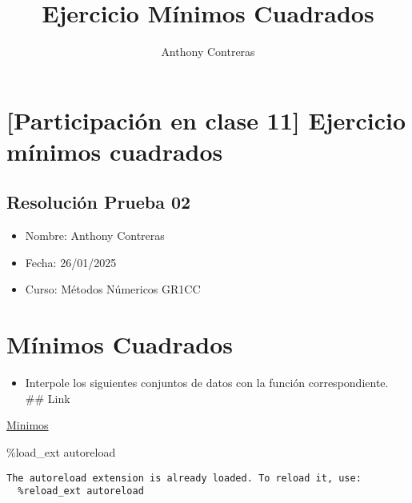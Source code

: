\documentclass[
  letterpaper,
  DIV=11,
  numbers=noendperiod]{scrartcl}
\title{Ejercicio Mínimos Cuadrados}
\author{Anthony Contreras}
\date{}
\newenvironment{Shaded}{\begin{snugshade}}{\end{snugshade}}
\newcommand{\NormalTok}[1]{\textcolor[rgb]{0.00,0.23,0.31}{#1}}
\newcommand{\OperatorTok}[1]{\textcolor[rgb]{0.37,0.37,0.37}{#1}}
\providecommand{\tightlist}{%
  \setlength{\itemsep}{0pt}\setlength{\parskip}{0pt}}\usepackage{longtable,booktabs,array}
\renewcommand*\contentsname{Tabla de contenidos}
\newcommand\contentsname{Tabla de contenidos}
\begin{document}
\maketitle

\renewcommand*\contentsname{Tabla de Contenidos}
{
\hypersetup{linkcolor=}
\setcounter{tocdepth}{3}
\tableofcontents
}

\section{{[}Participación en clase 11{]} Ejercicio mínimos
cuadrados}\label{participaciuxf3n-en-clase-11-ejercicio-muxednimos-cuadrados}

\subsection{Resolución Prueba 02}\label{resoluciuxf3n-prueba-02}

\begin{itemize}
\tightlist
\item
  Nombre: Anthony Contreras
\item
  Fecha: 26/01/2025
\item
  Curso: Métodos Númericos GR1CC
\end{itemize}

\section{Mínimos Cuadrados}\label{muxednimos-cuadrados}

\begin{itemize}
\tightlist
\item
  Interpole los siguientes conjuntos de datos con la función
  correspondiente. \#\# Link
\end{itemize}

\href{https://github.com/7heAnsw3r/metodos_numericos/blob/main/Participaci\%C3\%B3n/\%5BParticipaci\%C3\%B3n_en_clase_11_Anthony_Contreras.ipynb}{Minimos}

\begin{Shaded}
\begin{Highlighting}[]
\OperatorTok{\%}\NormalTok{load\_ext autoreload}
\end{Highlighting}
\end{Shaded}

\begin{verbatim}
The autoreload extension is already loaded. To reload it, use:
  %reload_ext autoreload
\end{verbatim}
\end{document}
